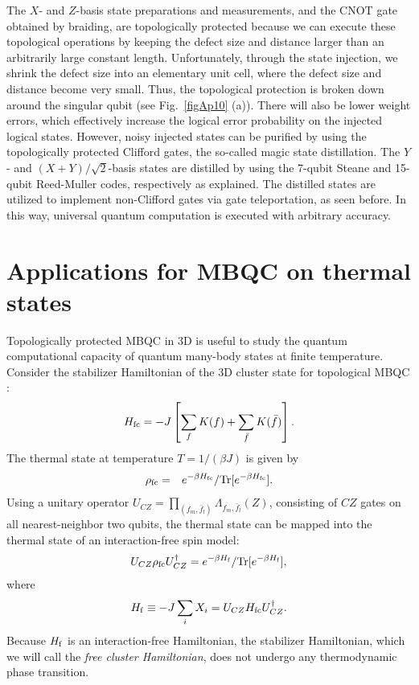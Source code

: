 The $X$- and $Z$-basis state preparations and measurements, and the CNOT gate obtained by braiding, are topologically protected because we can execute these topological operations by keeping the defect size and distance larger than an arbitrarily large constant length.
Unfortunately, through the state injection, we shrink the defect size into an elementary unit cell, where the defect size and distance become very small.
Thus, the topological protection is broken down around the singular qubit (see Fig.~\ref{figAp10} (a)). 
There will also be lower weight errors, which effectively increase the logical error probability on the injected logical states.
However, noisy injected states can be purified by using the topologically protected Clifford gates, the so-called magic state distillation.
The $Y$- and $(X+Y)/\sqrt{2}$-basis states are distilled by using the 7-qubit Steane and 15-qubit Reed-Muller codes, respectively
as explained.
The distilled states are utilized to implement non-Clifford gates via gate teleportation, as seen before.
In this way, universal quantum computation is executed with arbitrary accuracy.



\section{Applications for MBQC on thermal states}
Topologically protected MBQC in 3D is useful to study the quantum computational capacity of quantum many-body states at finite temperature.
Consider the stabilizer Hamiltonian of the 3D cluster state for topological MBQC \cite{MBQC_PRA,RaussendorfBravyi,BarrettThermal}:
\begin{eqnarray}
H_{\rm fc} = -J \left[ \sum _{f} K(f) + \sum_{\bar f}  K(\bar f) \right].
\end{eqnarray}
The thermal state at temperature $T=1/(\beta J)$ is given by
\begin{eqnarray}
\rho _{\rm fc} &=& e^{ - \beta H_{\rm fc} } / {\rm Tr}[e^{ - \beta H _{\rm fc} }].
\end{eqnarray}
Using a unitary operator $U_{CZ}= \prod _{(f_m,\bar f_l ) } \Lambda_{f_m,\bar f_l}(Z)$, consisting of $CZ$ gates on all nearest-neighbor two qubits, the thermal state can be mapped into the thermal state of an interaction-free spin model:
\begin{eqnarray}
U_{CZ} \rho _{\rm fc} U_{CZ}^{\dag}
=
e^{ - \beta H_{\rm f}   } / {\rm Tr}[e^{ - \beta H _{\rm f} }] ,
\end{eqnarray}
where 
\begin{eqnarray}
H_{\rm f} \equiv  -J \sum _{i} X_i = U_{CZ} H_{\rm fc} U_{CZ}^{\dagger}.
\end{eqnarray}
Because $H_{\rm f}$ is an interaction-free Hamiltonian, the stabilizer Hamiltonian, which we will call the {\it free cluster Hamiltonian}, does not undergo any thermodynamic phase transition.

